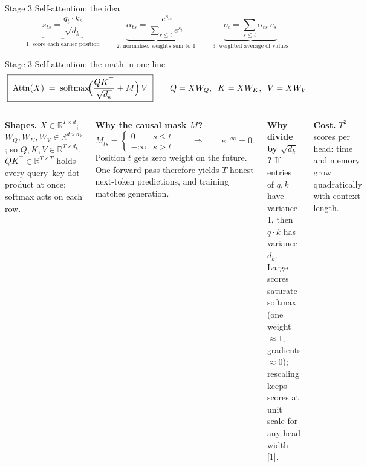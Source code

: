 \documentclass[aspectratio=169,10pt]{beamer}
\newcommand{\R}{\mathbb{R}}
\DeclareMathOperator{\softmax}{softmax}
\DeclareMathOperator{\Attn}{Attn}
\newcommand{\T}{\top}
\renewcommand{\cite}[1]{{\scriptsize\color{cTok}[#1]}}
\newcommand{\key}[1]{\textbf{\color{cAtt}#1}}
\begin{document}
\begin{frame}{Stage 3 \textbullet{} Self-attention: the idea}
\vspace{1.5mm}
\[
  \underbrace{s_{ts}=\frac{q_t\cdot k_s}{\sqrt{d_k}}}_{\text{1. score each earlier position}}
  \qquad
  \underbrace{\alpha_{ts}=\frac{e^{s_{ts}}}{\sum_{r\le t}e^{s_{tr}}}}_{\text{2. normalise: weights sum to 1}}
  \qquad
  \underbrace{o_t=\sum_{s\le t}\alpha_{ts}\,v_s}_{\text{3. weighted average of values}}
\]
\end{frame}

\begin{frame}{Stage 3 \textbullet{} Self-attention: the math in one line}
\vspace{-1mm}
\[
  \boxed{\;\Attn(X)\;=\;\softmax\!\Bigl(\frac{QK^{\T}}{\sqrt{d_k}}+M\Bigr)\,V\;}
  \qquad
  Q=XW_Q,\;\;K=XW_K,\;\;V=XW_V
\]
\vspace{-2mm}
\begin{columns}[T,onlytextwidth]
\small
\textbf{Shapes.} $X\in\R^{T\times d}$; $W_Q,W_K,W_V\in\R^{d\times d_k}$; so $Q,K,V\in\R^{T\times d_k}$.
$QK^{\T}\in\R^{T\times T}$ holds every query--key dot product at once; softmax acts on each row.

\vspace{1.5mm}
\key{Why the causal mask $M$?}
\[
  M_{ts}=\begin{cases}0 & s\le t\\ -\infty & s>t\end{cases}
  \qquad\Rightarrow\qquad e^{-\infty}=0 .
\]
Position $t$ gets zero weight on the future. One forward pass therefore yields $T$ honest
next-token predictions, and training matches generation.

\vspace{0.5mm}
\key{Why divide by $\sqrt{d_k}$?} If entries of $q,k$ have variance 1, then $q\cdot k$ has
variance $d_k$. Large scores saturate softmax (one weight $\approx 1$, gradients $\approx 0$);
rescaling keeps scores at unit scale for any head width \cite{1}.

\vspace{0.5mm}
\textbf{Cost.} $T^2$ scores per head: time and memory grow quadratically with context length.
\centering
{}


\end{columns}
\end{frame}
\end{document}
